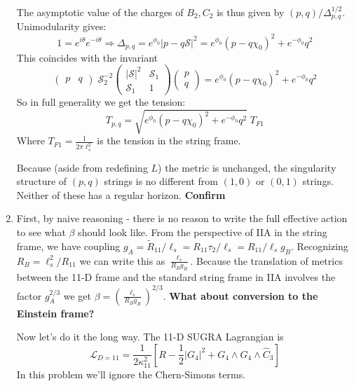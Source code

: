 \documentclass[11pt, class=article, crop=false]{standalone}
\begin{document}
\begin{enumerate}
\[	\]
	The asymptotic value of the charges of $B_2, C_2$ is thus given by $(p, q)/\Delta^{1/2}_{p,q}$. Unimodularity gives:
	\[
		1 = e^{i \theta} e^{-i\theta} \Rightarrow \Delta_{p,q} = e^{\phi_0} |p - q \mathcal S|^2 = e^{\phi_0} (p-q \chi_0)^2 + e^{-\phi_0} q^2
	\]
	This coincides with the invariant
	\[
		\begin{pmatrix}
			p & q
		\end{pmatrix} \;
		\mathcal S_2^{-2}
		\begin{pmatrix}
			|\mathcal S|^2 & \mathcal S_1\\
			\mathcal S_1 & 1
		\end{pmatrix}\begin{pmatrix}
			p \\ q
		\end{pmatrix}  = e^{\phi_0} (p - q \chi_0)^2 + e^{-\phi_0} q^2
	\]
	So in full generality we get the tension:
	\[
		T_{p,q} = \sqrt{e^{\phi_0} (p - q \chi_0)^2 + e^{-\phi_0} q^2} \; T_{F1}
	\]
	Where $T_{F1} = \frac{1}{2 \pi \ell_s^2}$ is the tension in the string frame. 
	
	Because (aside from redefining $L$) the metric is unchanged, the singularity structure of $(p,q)$ strings is no different from $(1,0)$ or $(0,1)$ strings. Neither of these has a regular horizon. \textbf{Confirm}
	
	
	\item First, by naive reasoning - there is no reason to write the full effective action to see what $\beta$ should look like. From the perspective of IIA in the string frame, we have coupling $g_A = \tilde R_{11}/\ell_s = R_{11} \tau_2/ \ell_s = R_{11}/\ell_{s} g_B$. Recognizing $R_B = \ell_s^2/R_11$ we can write this as $\frac{\ell_s}{R_B g_B}$. Because the translation of metrics between the 11-D frame and the standard string frame in IIA involves the factor $g_A^{2/3}$ we get $\beta = \left(\frac{\ell_s}{R_B g_B} \right)^{2/3}$. \textbf{What about conversion to the Einstein frame?}
	
	Now let's do it the long way. 
	The 11-D SUGRA Lagrangian is
	\[
		\mathcal L_{D=11} = \frac{1}{2\kappa_{11}^2}\left[R - \frac12 |G_4|^2 + G_4 \wedge G_4 \wedge \hat C_3 \right]
	\]
	In this problem we'll ignore the Chern-Simons terms. 
	

\end{enumerate}
\end{document}

